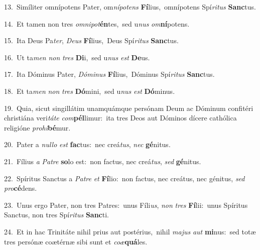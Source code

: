 {\numbfont\textcolor{\numbcolor}{13.}}~Simíliter omnípotens Pater, om\-\textit{ní}\-\textit{pot}\textit{ens} \textbf{Fí}\-lius,~\star omnípotens Spí\-\textit{ri}\-\textit{tus} \textbf{Sanc}\-tus.\par
{\numbfont\textcolor{\numbcolor}{14.}}~Et tamen non tres \textit{om}\-\textit{ni}\textit{pot}\textbf{én}tes,~\star sed u\textit{nus} \textit{om}\-\textbf{ní}potens.\par
{\numbfont\textcolor{\numbcolor}{15.}}~Ita Deus Pa\-\textit{ter}\-, \textit{De}\-\textit{us} \textbf{Fí}\-lius,~\star Deus Spí\-\textit{ri}\-\textit{tus} \textbf{Sanc}\-tus.\par
{\numbfont\textcolor{\numbcolor}{16.}}~Ut ta\textit{men} \textit{non} \textit{tres} \textbf{Di}\-i,~\star sed u\textit{nus} \textit{est} \textbf{De}\-us.\par
{\numbfont\textcolor{\numbcolor}{17.}}~Ita Dóminus Pater, \textit{Dó}\-\textit{mi}\textit{nus} \textbf{Fí}\-lius,~\star Dóminus Spí\-\textit{ri}\-\textit{tus} \textbf{Sanc}\-tus.\par
{\numbfont\textcolor{\numbcolor}{18.}}~Et ta\textit{men} \textit{non} \textit{tres} \textbf{Dó}\-mini,~\star sed u\textit{nus} \textit{est} \textbf{Dó}\-minus.\par
{\numbfont\textcolor{\numbcolor}{19.}}~Quia, sicut singillátim unamquámque persónam Deum ac Dóminum confitéri christiána veri\-\textit{tá}\-\textit{te} \textit{com}\-\textbf{pél}limur:~\star ita tres Deos aut Dóminos dícere cathólica religióne \textit{pro}\-\textit{hi}\textbf{bé}mur.\par
{\numbfont\textcolor{\numbcolor}{20.}}~Pater a \textit{nul}\-\textit{lo} \textit{est} \textbf{fac}\-tus:~\star nec creá\-\textit{tus}\-, \textit{nec} \textbf{gé}\-nitus.\par
{\numbfont\textcolor{\numbcolor}{21.}}~Fílius \textit{a} \textit{Pa}\-\textit{tre} \textbf{so}\-lo est:~\star non factus, nec creá\-\textit{tus}\-, \textit{sed} \textbf{gé}\-nitus.\par
{\numbfont\textcolor{\numbcolor}{22.}}~Spíritus Sanctus a \textit{Pa}\-\textit{tre} \textit{et} \textbf{Fí}\-lio:~\star non factus, nec creátus, nec génitus, \textit{sed} \textit{pro}\-\textbf{cé}dens.\par
{\numbfont\textcolor{\numbcolor}{23.}}~Unus ergo Pater, non tres Patres:~\dagger unus Fíli\-\textit{us}\-, \textit{non} \textit{tres} \textbf{Fí}\-lii:~\star unus Spíritus Sanctus, non tres Spí\-\textit{ri}\-\textit{tus} \textbf{Sanc}\-ti.\par
{\numbfont\textcolor{\numbcolor}{24.}}~Et in hac Trinitáte nihil prius aut postérius,~\dagger nihil \textit{ma}\-\textit{jus} \textit{aut} \textbf{mi}\-nus:~\star sed totæ tres persónæ coætérnæ sibi sunt et \textit{co}\-\textit{æ}\textbf{quá}les.\par
